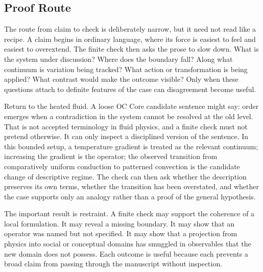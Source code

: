 \documentclass[11pt,a4paper,openany]{book}
\begin{document}
\subsection{Proof Route}
The route from claim to check is deliberately narrow, but it need not read like a recipe. A claim begins in ordinary language, where its force is easiest to feel and easiest to overextend. The finite check then asks the prose to slow down. What is the system under discussion? Where does the boundary fall? Along what continuum is variation being tracked? What action or transformation is being applied? What contrast would make the outcome visible? Only when these questions attach to definite features of the case can disagreement become useful. \cite{kadanoff_scaling,wilson_renormalization}\par
Return to the heated fluid. A loose OC Core candidate sentence might say: order emerges when a contradiction in the system cannot be resolved at the old level. That is not accepted terminology in fluid physics, and a finite check must not pretend otherwise. It can only inspect a disciplined version of the sentence. In this bounded setup, a temperature gradient is treated as the relevant continuum; increasing the gradient is the operator; the observed transition from comparatively uniform conduction to patterned convection is the candidate change of descriptive regime. The check can then ask whether the description preserves its own terms, whether the transition has been overstated, and whether the case supports only an analogy rather than a proof of the general hypothesis.\par
The important result is restraint. A finite check may support the coherence of a local formulation. It may reveal a missing boundary. It may show that an operator was named but not specified. It may show that a projection from physics into social or conceptual domains has smuggled in observables that the new domain does not possess. Each outcome is useful because each prevents a broad claim from passing through the manuscript without inspection.\par
\end{document}

